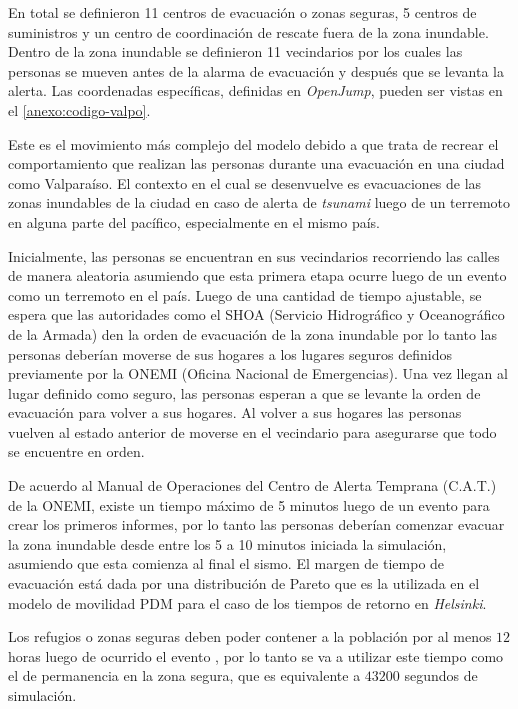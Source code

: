 En total se definieron 11 centros de evacuación o zonas seguras, 5 centros de
suministros y un centro de coordinación de rescate fuera de la zona inundable.
Dentro de la zona inundable se definieron 11 vecindarios por los cuales las
personas se mueven antes de la alarma de evacuación y después que se levanta la
alerta. Las coordenadas específicas, definidas en \textit{OpenJump}, pueden ser
vistas en el \ref{anexo:codigo-valpo}.



Este es el movimiento más complejo del modelo debido a que trata de recrear el
comportamiento que realizan las personas durante una evacuación en una ciudad
como Valparaíso. El contexto en el cual se desenvuelve es evacuaciones de las
zonas inundables de la ciudad en caso de alerta de \textit{tsunami} luego de un
terremoto en alguna parte del pacífico, especialmente en el mismo país.

Inicialmente, las personas se encuentran en sus vecindarios recorriendo las calles
de manera aleatoria asumiendo que esta primera etapa ocurre luego de un evento
como un terremoto en el país. Luego de una cantidad de tiempo ajustable, se
espera que las autoridades como el SHOA (Servicio Hidrográfico y Oceanográfico
de la Armada) den la orden de evacuación de la zona inundable por lo tanto las
personas deberían moverse de sus hogares a los lugares seguros definidos
previamente por la ONEMI (Oficina Nacional de Emergencias). Una vez llegan al
lugar definido como seguro, las personas esperan a que se levante la orden de
evacuación para volver a sus hogares. Al volver a sus hogares las personas
vuelven al estado anterior de moverse en el vecindario para asegurarse que todo
se encuentre en orden.


De acuerdo al Manual de Operaciones del Centro de Alerta Temprana (C.A.T.)
\cite{manual_cat} de la ONEMI, existe un tiempo máximo de 5 minutos luego de un
evento para crear los primeros informes, por lo tanto las personas deberían
comenzar evacuar la zona inundable desde entre los 5 a 10 minutos iniciada la
simulación, asumiendo que esta comienza al final el sismo. El margen de tiempo
de evacuación está dada por una distribución de Pareto que es la utilizada en el
modelo de movilidad PDM para el caso de los tiempos de retorno en
\textit{Helsinki}.

Los refugios o zonas seguras deben poder contener a la población por al menos
$12$ horas luego de ocurrido el evento \cite{guia_referencia_onemi}, por lo
tanto se va a utilizar este tiempo como el de permanencia en la zona segura, que
es equivalente a $43200$ segundos de simulación.


